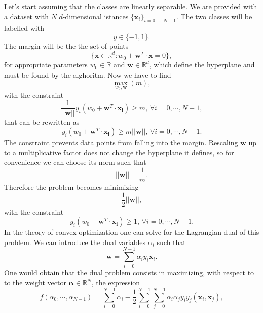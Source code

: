 \documentclass[a4paper]{article}
\begin{document}
Let's start assuming that the classes are linearly separable. We are provided with a dataset with $N$ $d$-dimensional istances $\{\mathbf{x}_i\}_{i=0,\cdots, N-1}$. The two classes will be labelled with $$y\in \{-1,1\}.$$ The margin will be the the set of points 
\begin{equation}
    \{\mathbf{x}\in\mathbb{R}^d: w_0+\mathbf{w}^T\cdot \mathbf{x}=0\},
    \label{margin definition}
\end{equation}  
for appropriate parameters $w_0\in \mathbb{R}$ and $\mathbf{w}\in \mathbb{R}^d$, which define the hyperplane and must be found by the alghoritm. Now we have to find $$\max_{w_0, \mathbf{w}}(m),$$ with the constraint 
\begin{equation}
    \frac{1}{||\mathbf{w}||}y_i(w_0+\mathbf{w}^T\cdot \mathbf{x_i})\geq m, \, \forall i=0,\cdots, N-1,
\end{equation}
that can be rewritten as 
\begin{equation}
    y_i(w_0+\mathbf{w}^T\cdot \mathbf{x_i})\geq m||\mathbf{w}||, \, \forall i=0,\cdots, N-1.
\end{equation}
The constraint prevents data points from falling into the margin. Rescaling $\mathbf{w}$ up to a multiplicative factor does not change the hyperplane it defines, so for convenience we can choose its norm such that 
\begin{equation}
    ||\mathbf{w}||=\frac{1}{m}.
\end{equation}
Therefore the problem becomes minimizing
$$\frac{1}{2}||\mathbf{w}||, $$ with the constraint 
\begin{equation}
    y_i(w_0+\mathbf{w}^T\cdot \mathbf{x_i})\geq 1, \, \forall i=0,\cdots, N-1.
    \label{constraint hard margin}
\end{equation}
In the theory of convex optimization one can solve for the Lagrangian dual of this problem. We can introduce the dual variables $\alpha_i$ such that
\begin{equation}
    \mathbf{w}=\sum_{i=0}^{N-1}\alpha_iy_i\mathbf{x}_i.
    \label{alpha def}
\end{equation} 
One would obtain that the dual problem consists in maximizing, with respect to to the weight vector $\mathbf{\alpha}\in\mathbb{R}^N$, the expression 
\begin{equation}
    f(\alpha_0,\cdots,\alpha_{N-1})=\sum_{i=0}^{N-1} \alpha_i-\frac{1}{2}\sum_{i=0}^{N-1}\sum_{j=0}^{N-1}\alpha_i\alpha_jy_iy_j(\mathbf{x}_i,\mathbf{x}_j),
    \label{dual problem SVM}
\end{equation}
\end{document}

